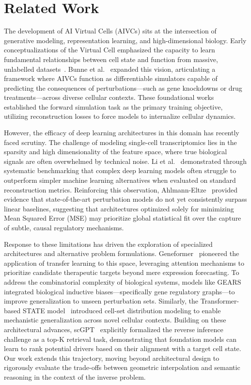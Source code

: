 \documentclass[conference]{IEEEtran}
\begin{document}
\section{Related Work}
The development of AI Virtual Cells (AIVCs) sits at the intersection of generative modeling, representation learning, and high-dimensional biology. Early conceptualizations of the Virtual Cell emphasized the capacity to learn fundamental relationships between cell state and function from massive, unlabelled datasets~\cite{roohani_virtual_2025}. Bunne et al.~\cite{bunne_how_2024} expanded this vision, articulating a framework where AIVCs function as differentiable simulators capable of predicting the consequences of perturbations—such as gene knockdowns or drug treatments—across diverse cellular contexts. These foundational works established the forward simulation task as the primary training objective, utilizing reconstruction losses to force models to internalize cellular dynamics.

However, the efficacy of deep learning architectures in this domain has recently faced scrutiny. The challenge of modeling single-cell transcriptomics lies in the sparsity and high dimensionality of the feature space, where true biological signals are often overwhelmed by technical noise. Li et al.~\cite{li_systematic_2024} demonstrated through systematic benchmarking that complex deep learning models often struggle to outperform simpler machine learning alternatives when evaluated on standard reconstruction metrics. Reinforcing this observation, Ahlmann-Eltze~\cite{ahlmann-eltze_deep-learning-based_nodate} provided evidence that state-of-the-art perturbation models do not yet consistently surpass linear baselines, suggesting that architectures optimized solely for minimizing Mean Squared Error (MSE) may prioritize global statistical fit over the capture of subtle, causal regulatory mechanisms.

Response to these limitations has driven the exploration of specialized architectures and alternative problem formulations. Geneformer~\cite{theodoris_transfer_2023} pioneered the application of transfer learning to this space, leveraging attention mechanisms to prioritize candidate therapeutic targets beyond mere expression forecasting. To address the combinatorial complexity of biological systems, models like GEARS~\cite{roohani_predicting_2024} integrated biological inductive biases—specifically gene regulatory graphs—to improve generalization to unseen perturbation sets. Similarly, the Transformer-based STATE model~\cite{adduri_predicting_nodate} introduced cell-set distribution modeling to enable mechanistic generalization across novel cellular contexts. Building on these architectural advances, scGPT~\cite{cui_scgpt_2024} explicitly formalized the reverse inference challenge as a top-K retrieval task, demonstrating that foundation models can learn to rank potential drivers based on their alignment with a target cell state. Our work extends this trajectory, moving beyond architectural design to rigorously evaluate the trade-offs between geometric interpolation and semantic reasoning in the context of the inverse problem.
\end{document}
